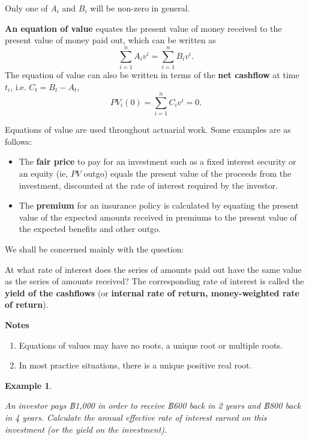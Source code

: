 \documentclass[landscape, 20pt]{extreport}
\theoremstyle{definition}
\theoremstyle{definition}
\newtheorem{example}{Example}[chapter]
\theoremstyle{definition}
\theoremstyle{definition}
\theoremstyle{remark}
\begin{document}
Only one of \(A_i\) and \(B_i\) will be non-zero in general.

\textbf{An equation of value} equates the present value of money received to
the present value of money paid out, which can be written as
\[\sum_{i=1}^n A_i v^i = \sum_{i=1}^n B_i v^i.\] The equation of value
can also be written in terms of the \textbf{net cashflow} at time \(t_i\), i.e.
\(C_t = B_t - A_t\), \[PV_i(0) = \sum_{i=1}^n C_i v^i =0.\]

Equations of value are used throughout actuarial work. Some examples are
as follows:

\begin{itemize}
\item
  The \textbf{fair price} to pay for an investment such as a fixed interest
  security or an equity (ie, \(PV\) outgo) equals the present value of
  the proceeds from the investment, discounted at the rate of interest
  required by the investor.
\item
  The \textbf{premium} for an insurance policy is calculated by equating
  the present value of the expected amounts received in premiums to
  the present value of the expected benefits and other outgo.
\end{itemize}

We shall be concerned mainly with the question:

At what rate of interest does the series of amounts paid out have the
same value as the series of amounts received? The corresponding rate of
interest is called the \textbf{yield of the cashflows} (or \textbf{internal rate of
return, money-weighted rate of return}).

\textbf{Notes}

\begin{enumerate}
\def\labelenumi{\arabic{enumi}.}
\item
  Equations of values may have no roots, a unique root or multiple
  roots.
\item
  In most practice situations, there is a unique positive real root.
\end{enumerate}

\newpage \begin{example}
\protect\hypertarget{exm:unlabeled-div-39}{}\label{exm:unlabeled-div-39}

\emph{An investor pays ฿1,000 in order to receive ฿600 back
in 2 years and ฿800 back in 4 years. Calculate the annual effective rate
of interest earned on this investment (or the yield on the investment).}

\end{example}
\end{document}
